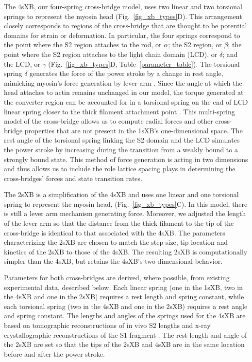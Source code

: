 \documentclass[]{article}
\begin{document}
The 4sXB, our four-spring cross-bridge model, uses two linear and two torsional springs to represent the myosin head (Fig.~\ref{fig_xb_types}D).
This arrangement closely corresponds to regions of the cross-bridge that are thought to be potential domains for strain or deformation. 
In particular, the four springs correspond to the point where the S2 region attaches to the rod, or $\alpha$; the S2 region, or $\beta$; the point where the S2 region attaches to the light chain domain (LCD), or $\delta$; and the LCD, or $\gamma$ (Fig.~\ref{fig_xb_types}D, Table~\ref{parameter_table}). 
The torsional spring $\delta$ generates the force of the power stroke by a change in rest angle, mimicking myosin's force generation by lever-arm \citep{Houdusse2000, Houdusse2001}. 
Since the angle at which the head attaches to actin remains unchanged in our model, the torque generated at the converter region can be accounted for in a torsional spring on the end of LCD linear spring closer to the thick filament attachment point \citep{Houdusse2000}. 
This multi-spring model of the cross-bridge allows us to compute radial forces and other cross-bridge properties that are not present in the 1sXB's one-dimensional space. 
The rest angle of the torsional spring linking the S2 domain and the LCD simulates the power stroke by increasing during the transition from a weakly bound to a strongly bound state.
This method of force generation is acting in two dimensions and thus allows us to include the role lattice spacing plays in determining the cross-bridges' forces and state transition rates.

The 2sXB is a simplification of the 4sXB and uses one linear and one torsional spring to represent the myosin head, (Fig.~\ref{fig_xb_types}C).
In this model, there is still a lever arm mechanism generating force.  
Moreover, we adjusted the length of the lever arm so that the distance from the thick filament to the tip of the cross-bridge is identical to that associated with the 4sXB\@.
The parameters characterizing the 2sXB are chosen to match the step size, tip location and kinetics of the 2sXB to those of the 4sXB\@. 
The resulting 2sXB is computationally simpler than the 4sXB, but retains the 4sXB's two-dimensional behavior.

Parameters for both cross-bridges are derived, where possible, from existing experimental data, described below.  
Each linear spring (one in the 1sXB, two in the 4sXB and one in the 2sXB) requires a rest length and spring constant, while each torsional spring (two in the 4sXB and one in the 2sXB) requires a rest angle and spring constant.
The lengths and angles of the springs used for the 4sXB are based on tomographic reconstructions of in vivo S2 lengths and x-ray crystallographic reconstructions of the S1 fragment \citep{Taylor1999, Rayment1993}.
The rest length and angle of the 2sXB are set so that the tips of the 2sXB and 4sXB are in the same location before and after the power stroke.
\end{document}
